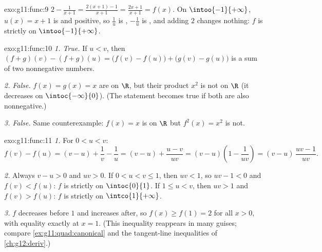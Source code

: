 \begin{solution}{exo:g11:func:9}
$2 - \frac{1}{x+1} = \frac{2(x+1) - 1}{x+1} = \frac{2x+1}{x+1} = f(x)$.
On $\intoo{-1}{+\infty}$, $u(x) = x + 1$ is  and positive, so
$\frac1u$ is , $-\frac1u$ is , and adding $2$ changes
nothing: $f$ is strictly  on $\intoo{-1}{+\infty}$.
\end{solution}

\begin{solution}{exo:g11:func:10}
\emph{1. True.} If $u < v$, then
$(f+g)(v) - (f+g)(u) = \bigl(f(v)-f(u)\bigr) + \bigl(g(v)-g(u)\bigr)$ is
a sum of two nonnegative numbers.

\emph{2. False.} $f(x) = g(x) = x$ are  on $\R$, but their
product $x^2$ is not  on $\R$ (it decreases on
$\intoc{-\infty}{0}$). (The statement becomes true if both  are
also nonnegative.)

\emph{3. False.} Same counterexample: $f(x) = x$ is  on $\R$
but $f^2(x) = x^2$ is not.
\end{solution}

\begin{solution}{exo:g11:func:11}
\emph{1.} For $0 < u < v$:
\[
f(v) - f(u) = (v - u) + \frac1v - \frac1u
= (v - u) + \frac{u - v}{uv}
= (v - u)\left(1 - \frac{1}{uv}\right)
= (v - u)\,\frac{uv - 1}{uv}.
\]

\emph{2.} Always $v - u > 0$ and $uv > 0$. If $0 < u < v \leq 1$, then
$uv < 1$, so $uv - 1 < 0$ and $f(v) < f(u)$: $f$ is strictly 
on $\intoc{0}{1}$. If $1 \leq u < v$, then $uv > 1$ and $f(v) > f(u)$:
$f$ is strictly  on $\intco{1}{+\infty}$.

\emph{3.} $f$ decreases before $1$ and increases after, so
$f(x) \geq f(1) = 2$ for all $x > 0$, with equality exactly at $x = 1$.
(This inequality reappears in many guises; compare
\cref{ex:g11:quad:canonical} and the tangent-line inequalities of
\cref{ch:g12:deriv}.)
\end{solution}

